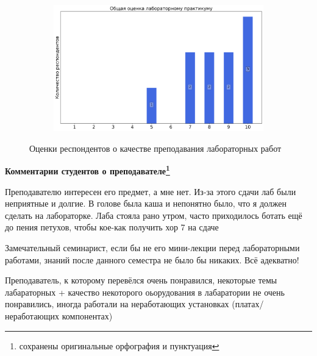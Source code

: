 \begin{figure}[H]
\begin{subfigure}[b]{0.45\textwidth}
			\end{subfigure}
			\begin{subfigure}[b]{0.45\textwidth}
				\centering
				\includegraphics[width=\textwidth]{images/3 course/Аналоговая электроника/labniks-marks-Зарипов Р.А.-3.png}
			\end{subfigure}	
			\caption{Оценки респондентов о качестве преподавания лабораторных работ}
		\end{figure}

		\textbf{Комментарии студентов о преподавателе\protect\footnote{сохранены оригинальные орфография и пунктуация}}
            \begin{commentbox} 
                Преподавателю интересен его предмет, а мне нет. Из-за этого сдачи лаб были неприятные и долгие. В голове была каша и непонятно было, что я должен сделать на лабораторке. Лаба стояла рано утром, часто приходилось ботать ещё до пения петухов, чтобы кое-как получить хор 7 на сдаче 
            \end{commentbox} 
        
            \begin{commentbox} 
                Замечательный семинарист, если бы не его мини-лекции перед лабораторными работами, знаний после данного семестра не было бы никаких. Всё адекватно! 
            \end{commentbox} 
        
            \begin{commentbox} 
                Преподаватель, к которому перевёлся очень понравился, некоторые темы лабараторных + качество некоторого оьорудования в лабаратории не очень понравились, иногда работали на неработающих установках (платах/неработающих компонентах) 
            \end{commentbox} 
        
